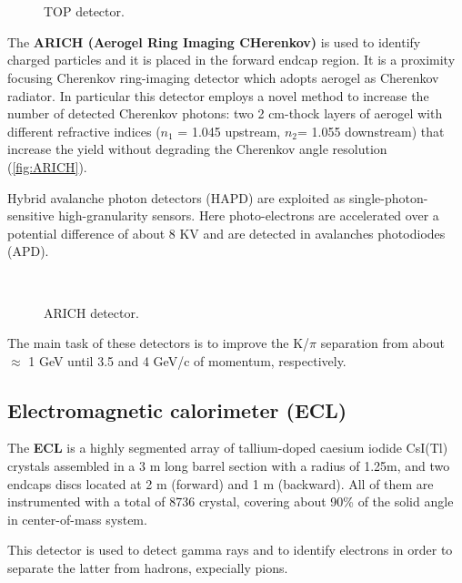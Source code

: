 \begin{figure}[h!]
\centering
{}\\
\\
\caption{TOP detector.}
\label{fig:TOP}
\end{figure}

The \textbf{ARICH (Aerogel Ring Imaging CHerenkov)} is used to identify charged particles and it is placed in the forward endcap region. It is a proximity focusing Cherenkov ring-imaging detector which adopts aerogel as Cherenkov radiator. In particular this detector employs a novel method to increase the number of detected Cherenkov photons: two 2 cm-thock layers of aerogel with different refractive indices ($n_{1}$ = 1.045 upstream, $n_{2}$= 1.055 downstream) that increase the yield without degrading the Cherenkov angle resolution (\autoref{fig:ARICH}).

Hybrid avalanche photon detectors (HAPD) are exploited as single-photon-sensitive high-granularity sensors. Here photo-electrons are accelerated over a potential difference of about 8 KV and are detected in avalanches photodiodes (APD).\\

\begin{figure}[h!]
\centering
{}\quad
{}\\
\caption{ARICH detector.}
\label{fig:ARICH}
\end{figure}

The main task of these detectors is to improve the K/$\pi$ separation from about $\approx$ 1 GeV until 3.5 and 4 GeV/c of momentum, respectively.

\subsection{Electromagnetic calorimeter (ECL)}

The \textbf{ECL} is a highly segmented array of tallium-doped caesium iodide CsI(Tl) crystals assembled in a 3 m long barrel section with a radius of 1.25m, and two endcaps discs located at 2 m (forward) and 1 m (backward). All of them are instrumented with a total of 8736 crystal, covering about 90\% of the solid angle in center-of-mass system. 

This detector is used to detect gamma rays and to identify electrons in order to separate the latter from hadrons, expecially pions.

